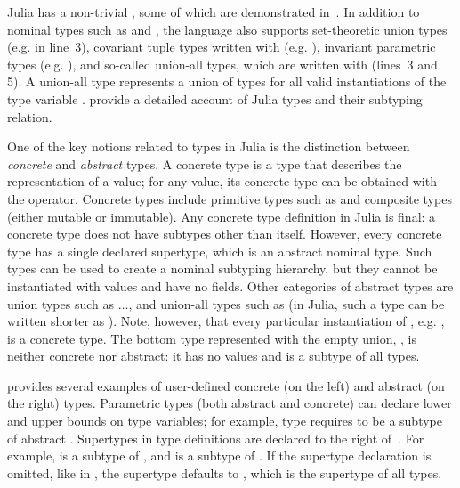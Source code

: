 Julia has a non-trivial  \ty, some of which are
demonstrated in~. In addition to nominal types such
as  and , the language also supports set-theoretic union
types (e.g.  in line~3),
covariant tuple types written with  (e.g. ),
invariant parametric types (e.g. ),
and so-called union-all types, which are written with  (lines~3 and 5).
A union-all type  represents a union of types  for all
valid instantiations of the type variable . \citet{TODO} provide a detailed
account of Julia types and their subtyping relation.

One of the key notions related to types in Julia is the distinction between
\emph{concrete} and \emph{abstract} types. A concrete type \gty is a type that
describes the representation of a value; for any value, its concrete type can be
obtained with the  operator. Concrete types include primitive types
such as  and composite  types (either mutable or
immutable). Any concrete type definition in Julia is final: a concrete type does
not have subtypes other than itself. However, every concrete type has a single
declared supertype, which is an abstract nominal type. Such types can be used
to create a nominal subtyping hierarchy, but they cannot be instantiated with
values and have no fields. Other categories of abstract types are union types
such as $\ldots$, and union-all types
such as  (in Julia, such a type can be written shorter
as ). Note, however, that every particular instantiation of
, e.g. , is a concrete type.
The bottom type represented with the empty union, , is neither
concrete nor abstract: it has no values and is a subtype of all types.

 provides several examples of user-defined
concrete (on the left) and abstract (on the right) types. Parametric types (both
abstract and concrete) can declare lower and upper bounds on type variables;
for example, type  requires  to be a subtype of
abstract .
Supertypes in type definitions are declared to the right of~\cjl{<:}.
For example,  is a subtype of , and  is a
subtype of . If the supertype declaration is omitted, like in
, the supertype defaults to ,
which is the supertype of all types.

